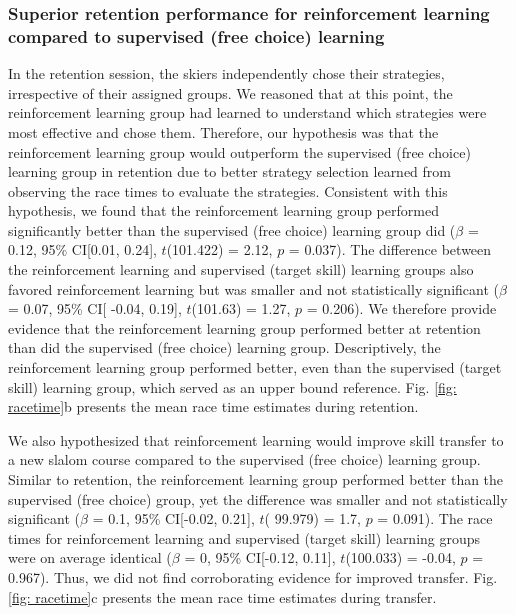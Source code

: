 \documentclass[pdflatex,sn-nature]{sn-jnl}%
\theoremstyle{thmstyleone}%
\theoremstyle{thmstyletwo}%
\theoremstyle{thmstylethree}%
\begin{document}
\subsubsection{Superior retention performance for reinforcement learning compared to supervised (free choice) learning}\label{result_racetime_retention}
In the retention session, the skiers independently chose their strategies, irrespective of their assigned groups. We reasoned that at this point, the reinforcement learning group had learned to understand which strategies were most effective and chose them. Therefore, our hypothesis was that the reinforcement learning group would outperform the supervised (free choice) learning group in retention due to better strategy selection learned from observing the race times to evaluate the strategies. Consistent with this hypothesis, we found that the reinforcement learning group performed significantly better than the supervised (free choice) learning group did ($\beta$ = 0.12, 95\% CI[0.01, 0.24], $t$(101.422) = 2.12, $p$ = 0.037). The difference between the reinforcement learning and supervised (target skill) learning groups also favored reinforcement learning but was smaller and not statistically significant  ($\beta$ = 0.07, 95\% CI[ -0.04, 0.19], $t$(101.63) = 1.27, $p$ = 0.206). We therefore provide evidence that the reinforcement learning group performed better at retention than did the supervised (free choice) learning group. Descriptively, the reinforcement learning group performed better, even than the supervised (target skill) learning group, which served as an upper bound reference. Fig. \ref{fig: racetime}b presents the mean race time estimates during retention. 


We also hypothesized that reinforcement learning would improve skill transfer to a new slalom course compared to the supervised (free choice) learning group. Similar to retention, the reinforcement learning group performed better than the supervised (free choice) group, yet the difference was smaller and not statistically significant ($\beta$ = 0.1, 95\% CI[-0.02, 0.21], $t$( 99.979) = 1.7, $p$  = 0.091). The race times for reinforcement learning and supervised (target skill) learning groups were on average identical ($\beta$ = 0, 95\% CI[-0.12, 0.11], $t$(100.033) = -0.04, $p$ = 0.967). Thus, we did not find corroborating evidence for improved transfer. Fig. \ref{fig: racetime}c presents the mean race time estimates during transfer. 
\end{document}

